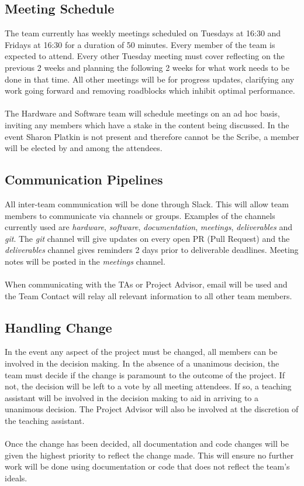 \documentclass[11pt]{article}
\begin{document}
\subsection{Meeting Schedule}
The team currently has weekly meetings scheduled on Tuesdays at 16:30 and Fridays at 16:30 for a duration of 50 minutes. Every member of the team is expected to attend. Every other Tuesday meeting must cover reflecting on the previous 2 weeks and planning the following 2 weeks for what work needs to be done in that time. All other meetings will be for progress updates, clarifying any work going forward and removing roadblocks which inhibit optimal performance. \\ \\
The Hardware and Software team will schedule meetings on an ad hoc basis, inviting any members which have a stake in the content being discussed. In the event Sharon Platkin is not present and therefore cannot be the Scribe, a member will be elected by and among the attendees.
\subsection{Communication Pipelines}
All inter-team communication will be done through Slack. This will allow team members to communicate via channels or groups. Examples of the channels currently used are \textit{hardware}, \textit{software}, \textit{documentation}, \textit{meetings}, \textit{deliverables} and \textit{git}. The \textit{git} channel will give updates on every open PR (Pull Request) and the \textit{deliverables} channel gives reminders 2 days prior to deliverable deadlines. Meeting notes will be posted in the \textit{meetings} channel. \\ \\
When communicating with the TAs or Project Advisor, email will be used and the Team Contact will relay all relevant information to all other team members.
\subsection{Handling Change}
In the event any aspect of the project must be changed, all members can be involved in the decision making. In the absence of a unanimous decision, the team must decide if the change is paramount to the outcome of the project. If not, the decision will be left to a vote by all meeting attendees. If so, a teaching assistant will be involved in the decision making to aid in arriving to a unanimous decision. The Project Advisor will also be involved at the discretion of the teaching assistant. \\ \\
Once the change has been decided, all documentation and code changes will be given the highest priority to reflect the change made. This will ensure no further work will be done using documentation or code that does not reflect the team's ideals.
\end{document}

